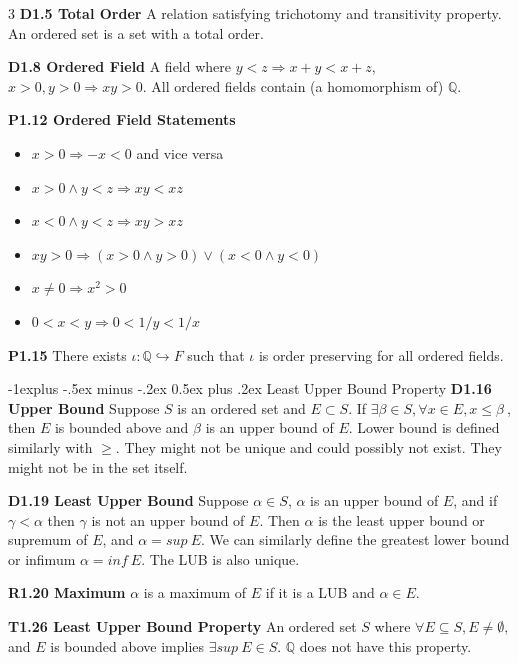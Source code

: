 \documentclass[10pt, landscape]{article}
\makeatletter
\renewcommand{\section}{\@startsection{section}{1}{0mm}%
                                {-1ex plus -.5ex minus -.2ex}%
                                {0.5ex plus .2ex}%
                                {\normalfont\large\bfseries}}
\renewcommand{\section}{\@startsection{section}{2}{0mm}%
                                {-1explus -.5ex minus -.2ex}%
                                {0.5ex plus .2ex}%
                                {\normalfont\normalsize\bfseries}}
\makeatother
\begin{document}
\begin{multicols*}{3}
\textbf{D1.5 Total Order} A relation satisfying trichotomy and transitivity property. An ordered set is a set with a total order.

\textbf{D1.8 Ordered Field} A field where $y < z \Rightarrow x+y<x+z$, $x>0, y>0 \Rightarrow xy > 0$. All ordered fields contain (a homomorphism of) $\mathbb{Q}$.

\textbf{P1.12 Ordered Field Statements}
\begin{itemize}
    \item $x>0 \Rightarrow -x < 0$ and vice versa
    \item $x > 0 \land y < z \Rightarrow xy<xz$
    \item $x<0 \land y<z \Rightarrow xy > xz$
    \item $xy>0 \Rightarrow (x > 0 \land y>0) \lor (x<0 \land y<0)$
    \item $x \neq 0 \Rightarrow x^2>0$
    \item $0<x<y \Rightarrow 0< 1/y < 1/x$
\end{itemize}

\textbf{P1.15} There exists $\iota : \mathbb{Q} \hookrightarrow F$ such that $\iota$ is order preserving for all ordered fields.

\section{Least Upper Bound Property}
\textbf{D1.16 Upper Bound} Suppose $S$ is an ordered set and $E \subset S$. If $\exists \beta \in S, \forall x \in E, x \leq \beta \ $, then $E$ is bounded above and $\beta$ is an upper bound of $E$. Lower bound is defined similarly with $\geq$. They might not be unique and could possibly not exist. They might not be in the set itself.

\textbf{D1.19 Least Upper Bound} Suppose $\alpha \in S$, $\alpha$ is an upper bound of $E$, and if $\gamma < \alpha$ then $\gamma$ is not an upper bound of $E$. Then $\alpha$ is the least upper bound or supremum of $E$, and $\alpha = sup\ E$. We can similarly define the greatest lower bound or infimum $\alpha = inf \ E$. The LUB is also unique.

\textbf{R1.20 Maximum} $\alpha$ is a maximum of $E$ if it is a LUB and $\alpha \in E$.

\textbf{T1.26 Least Upper Bound Property} An ordered set $S$ where $\forall E \subseteq S, E \neq \emptyset,$ and $E$ is bounded above implies $\exists sup\ E \in S$. $\mathbb{Q}$ does not have this property.


\end{multicols*}
\end{document}
